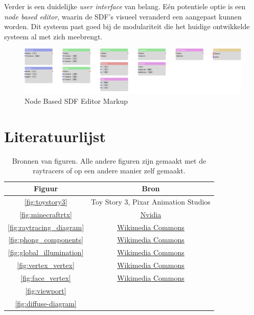 \documentclass[12pt, a4paper]{article}
\begin{document}
Verder is een duidelijke \textit{user interface} van belang. Eén potentiele optie is een \textit{node based editor}, waarin de SDF's visueel veranderd een aangepast kunnen worden. Dit systeem past goed bij de modulariteit die het huidige ontwikkelde systeem al met zich meebrengt.

\begin{figure}[H]
	\centering
	\includegraphics[width=\textwidth]{node_editor.png}
	\caption{Node Based SDF Editor Markup}
	\label{fig:node_editor}
\end{figure}
\clearpage
\section{Literatuurlijst}
\begingroup
\renewcommand{\section}[2]{}%


\endgroup
\begin{table}[H]
	\centering
	\begin{tabular}{| c c |}
		\hline
		Figuur & Bron \\
		\hline
		\ref{fig:toystory3} & Toy Story 3, Pixar Animation Studios \\
		\ref{fig:minecraftrtx} & \underline{\hyperlink{https://www.youtube.com/watch?v=91kxRGeg9wQ}{Nvidia}} \\
		\ref{fig:raytracing_diagram} & \underline{\hyperlink{https://commons.wikimedia.org/wiki/File:Ray_trace_diagram.svg}{Wikimedia Commons}} \\
		\ref{fig:phong_components} & \underline{\hyperlink{https://commons.wikimedia.org/wiki/File:Phong_components_version_4.png}{Wikimedia Commons}} \\
		\ref{fig:global_illumination} & \underline{\hyperlink{https://commons.wikimedia.org/wiki/File:Global_illumination1.png}{Wikimedia Commons}} \\
		\ref{fig:vertex_vertex} & \underline{\hyperlink{https://commons.wikimedia.org/wiki/File:Vertex-Vertex_Meshes_(VV).png}{Wikimedia Commons}} \\
		\ref{fig:face_vertex} & \underline{\hyperlink{https://commons.wikimedia.org/wiki/File:Mesh_fv.jpg}{Wikimedia Commons}} \\
		\ref{fig:viewport} & \cite{ComputerGraphicsFromScratch} \\
		\ref{fig:diffuse-diagram} & \cite{ComputerGraphicsFromScratch} \\
		\hline
	\end{tabular}
	\caption{Bronnen van figuren. Alle andere figuren zijn gemaakt met de raytracers of op een andere manier zelf gemaakt.}
\end{table}
\clearpage
\end{document}
